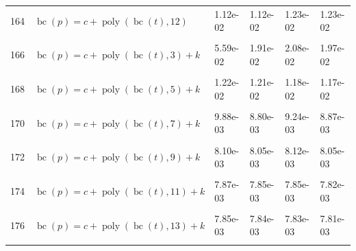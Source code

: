 \documentclass[12pt,a4paper]{article}
\DeclareMathOperator{\bc}{bc}
\DeclareMathOperator{\poly}{poly}
\begin{document}
\begin{longtable}[t]{ll>{\raggedleft\arraybackslash}p{2cm}>{\raggedleft\arraybackslash}p{2cm}>{\raggedleft\arraybackslash}p{2cm}>{\raggedleft\arraybackslash}p{2cm}}
164 & $\bc(p) = c + \poly\left( \bc(t), 12 \right)$ & 1.12e-02 & 1.12e-02 & 1.23e-02 & 1.23e-02\\
\cellcolor{gray!6}{165} & \cellcolor{gray!6}{$\bc(p) = c + \poly\left( \bc(t), 13 \right)$} & \cellcolor{gray!6}{1.12e-02} & \cellcolor{gray!6}{1.12e-02} & \cellcolor{gray!6}{1.23e-02} & \cellcolor{gray!6}{1.23e-02}\\
166 & $\bc(p) = c + \poly\left( \bc(t), 3 \right) + k$ & 5.59e-02 & 1.91e-02 & 2.08e-02 & 1.97e-02\\
\cellcolor{gray!6}{167} & \cellcolor{gray!6}{$\bc(p) = c + \poly\left( \bc(t), 4 \right) + k$} & \cellcolor{gray!6}{2.40e-02} & \cellcolor{gray!6}{2.26e-02} & \cellcolor{gray!6}{2.50e-02} & \cellcolor{gray!6}{2.42e-02}\\
168 & $\bc(p) = c + \poly\left( \bc(t), 5 \right) + k$ & 1.22e-02 & 1.21e-02 & 1.18e-02 & 1.17e-02\\
\cellcolor{gray!6}{169} & \cellcolor{gray!6}{$\bc(p) = c + \poly\left( \bc(t), 6 \right) + k$} & \cellcolor{gray!6}{1.05e-02} & \cellcolor{gray!6}{9.62e-03} & \cellcolor{gray!6}{1.08e-02} & \cellcolor{gray!6}{9.80e-03}\\
170 & $\bc(p) = c + \poly\left( \bc(t), 7 \right) + k$ & 9.88e-03 & 8.80e-03 & 9.24e-03 & 8.87e-03\\
\cellcolor{gray!6}{171} & \cellcolor{gray!6}{$\bc(p) = c + \poly\left( \bc(t), 8 \right) + k$} & \cellcolor{gray!6}{8.03e-03} & \cellcolor{gray!6}{8.00e-03} & \cellcolor{gray!6}{8.02e-03} & \cellcolor{gray!6}{7.99e-03}\\
172 & $\bc(p) = c + \poly\left( \bc(t), 9 \right) + k$ & 8.10e-03 & 8.05e-03 & 8.12e-03 & 8.05e-03\\
\cellcolor{gray!6}{173} & \cellcolor{gray!6}{$\bc(p) = c + \poly\left( \bc(t), 10 \right) + k$} & \cellcolor{gray!6}{7.87e-03} & \cellcolor{gray!6}{7.85e-03} & \cellcolor{gray!6}{7.85e-03} & \cellcolor{gray!6}{7.82e-03}\\
174 & $\bc(p) = c + \poly\left( \bc(t), 11 \right) + k$ & 7.87e-03 & 7.85e-03 & 7.85e-03 & 7.82e-03\\
\cellcolor{gray!6}{175} & \cellcolor{gray!6}{$\bc(p) = c + \poly\left( \bc(t), 12 \right) + k$} & \cellcolor{gray!6}{7.85e-03} & \cellcolor{gray!6}{7.84e-03} & \cellcolor{gray!6}{7.83e-03} & \cellcolor{gray!6}{7.81e-03}\\
176 & $\bc(p) = c + \poly\left( \bc(t), 13 \right) + k$ & 7.85e-03 & 7.84e-03 & 7.83e-03 & 7.81e-03\\
\cellcolor{gray!6}{177} & \cellcolor{gray!6}{$\bc(p) = c + \poly\left( \bc(t), 3 \right) * k$} & \cellcolor{gray!6}{5.48e-02} & \cellcolor{gray!6}{1.77e-02} & \cellcolor{gray!6}{1.96e-02} & \cellcolor{gray!6}{1.84e-02}\\

\end{longtable}
\end{document}
